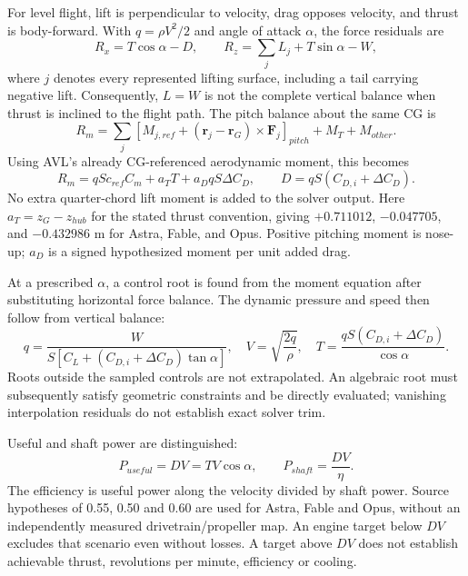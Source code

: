 \documentclass[10pt,letterpaper]{article}
\begin{document}
For level flight, lift is perpendicular to velocity, drag opposes velocity, and thrust is body-forward. With $q=\rho V^2/2$ and angle of attack $\alpha$, the force residuals are
\begin{equation}
R_x=T\cos\alpha-D,\qquad
R_z=\sum_j L_j+T\sin\alpha-W,
\label{eq:forces}
\end{equation}
where $j$ denotes every represented lifting surface, including a tail carrying negative lift. Consequently, $L=W$ is not the complete vertical balance when thrust is inclined to the flight path. The pitch balance about the same CG is
\begin{equation}
R_m=\sum_j\left[M_{j,ref}+(\boldsymbol r_j-\boldsymbol r_G)\times\boldsymbol F_j\right]_{pitch}
+M_T+M_{other}.
\label{eq:moments}
\end{equation}
Using AVL's already CG-referenced aerodynamic moment, this becomes
\begin{equation}
R_m=qSc_{ref}C_m+a_TT+a_DqS\Delta C_D,
\qquad D=qS(C_{D,i}+\Delta C_D).
\label{eq:solvermoment}
\end{equation}
No extra quarter-chord lift moment is added to the solver output. Here $a_T=z_G-z_{hub}$ for the stated thrust convention, giving $+0.711012$, $-0.047705$, and $-0.432986$ m for Astra, Fable, and Opus. Positive pitching moment is nose-up; $a_D$ is a signed hypothesized moment per unit added drag.

At a prescribed $\alpha$, a control root is found from the moment equation after substituting horizontal force balance. The dynamic pressure and speed then follow from vertical balance:
\begin{equation}
q=\frac{W}{S[C_L+(C_{D,i}+\Delta C_D)\tan\alpha]},\quad
V=\sqrt{\frac{2q}{\rho}},\quad
T=\frac{qS(C_{D,i}+\Delta C_D)}{\cos\alpha}.
\label{eq:trim}
\end{equation}
Roots outside the sampled controls are not extrapolated. An algebraic root must subsequently satisfy geometric constraints and be directly evaluated; vanishing interpolation residuals do not establish exact solver trim.

Useful and shaft power are distinguished:
\begin{equation}
P_{useful}=DV=TV\cos\alpha,\qquad
P_{shaft}=\frac{DV}{\eta}.
\label{eq:power}
\end{equation}
The efficiency is useful power along the velocity divided by shaft power. Source hypotheses of 0.55, 0.50 and 0.60 are used for Astra, Fable and Opus, without an independently measured drivetrain/propeller map. An engine target below $DV$ excludes that scenario even without losses. A target above $DV$ does not establish achievable thrust, revolutions per minute, efficiency or cooling.
\end{document}

